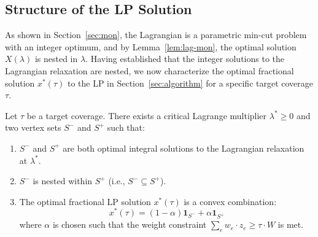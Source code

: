 \subsection{Structure of the LP Solution}
As shown in Section~\ref{sec:mon}, the Lagrangian is a parametric min-cut problem with an integer optimum, and by Lemma~\ref{lem:lag-mon}, the optimal solution $X(\lambda)$ is nested in $\lambda$. Having established that the integer solutions to the Lagrangian relaxation are nested, we now characterize the optimal fractional solution $x^*(\tau)$ to the LP in Section~\ref{sec:algorithm} for a specific target coverage $\tau$.

\begin{lemma}
\label{lem:lp_structure}
Let $\tau$ be a target coverage. There exists a critical Lagrange multiplier $\lambda^* \ge 0$ and two vertex sets $S^-$ and $S^+$ such that:
\begin{enumerate}
    \item $S^-$ and $S^+$ are both optimal integral solutions to the Lagrangian relaxation at $\lambda^*$.
    \item $S^-$ is nested within $S^+$ (i.e., $S^- \subseteq S^+$).
    \item The optimal fractional LP solution $x^*(\tau)$ is a convex combination:
    \[ x^*(\tau) = (1-\alpha) \mathbf{1}_{S^-} + \alpha \mathbf{1}_{S^+} \]
    where $\alpha$ is chosen such that the weight constraint $\sum_e w_e \cdot z_e \ge \tau \cdot W$ is met.
\end{enumerate}
\end{lemma}

